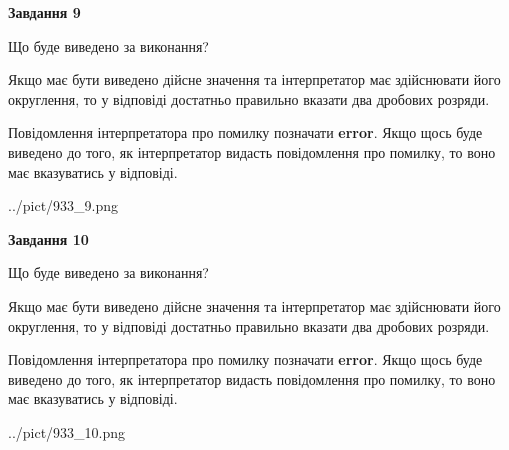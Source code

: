 \documentclass[12pt, ukrainian]{article}
\begin{document}
{\begin {Large}
{\begin {center}\textbf{Завдання 9}\end {center}}\par
Що буде виведено за виконання? \par

Якщо має бути виведено дійсне значення та інтерпретатор має здійснювати його округлення, 
то у відповіді достатньо правильно вказати два дробових розряди.

Повідомлення інтерпретатора про помилку позначати \textbf{error}.
Якщо щось буде виведено до того, як інтерпретатор видасть повідомлення про помилку, 
то воно має вказуватись у відповіді. \par

\begin{center}
	{../pict/933_9.png}
\end{center}
\newpage

{\begin {center}\textbf{Завдання 10}\end {center}}\par
Що буде виведено за виконання? \par

Якщо має бути виведено дійсне значення та інтерпретатор має здійснювати його округлення, 
то у відповіді достатньо правильно вказати два дробових розряди.

Повідомлення інтерпретатора про помилку позначати \textbf{error}.
Якщо щось буде виведено до того, як інтерпретатор видасть повідомлення про помилку, 
то воно має вказуватись у відповіді. \par

\begin{center}
	{../pict/933_10.png}
\end{center}
\newpage

\end {Large}}
\end{document}
